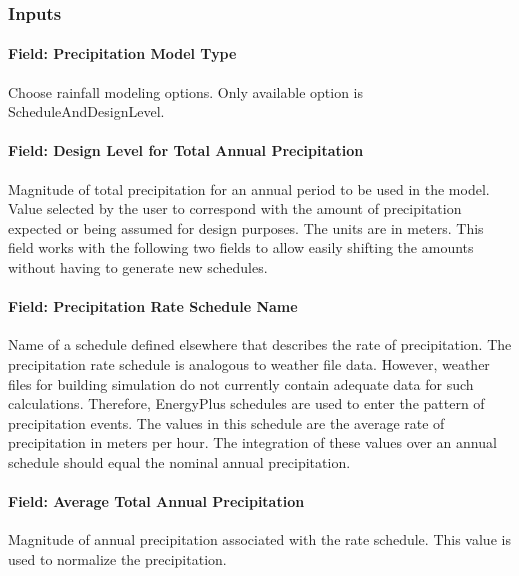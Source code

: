 \subsubsection{Inputs}\label{inputs-22-002}

\paragraph{Field: Precipitation Model Type}\label{field-precipitation-model-type}

Choose rainfall modeling options. Only available option is ScheduleAndDesignLevel.

\paragraph{Field: Design Level for Total Annual Precipitation}\label{field-design-level-for-total-annual-precipitation}

Magnitude of total precipitation for an annual period to be used in the model. Value selected by the user to correspond with the amount of precipitation expected or being assumed for design purposes. The units are in meters. This field works with the following two fields to allow easily shifting the amounts without having to generate new schedules.

\paragraph{Field: Precipitation Rate Schedule Name}\label{field-precipitation-rate-schedule-name}

Name of a schedule defined elsewhere that describes the rate of precipitation. The precipitation rate schedule is analogous to weather file data. However, weather files for building simulation do not currently contain adequate data for such calculations. Therefore, EnergyPlus schedules are used to enter the pattern of precipitation events. The values in this schedule are the average rate of precipitation in meters per hour. The integration of these values over an annual schedule should equal the nominal annual precipitation.

\paragraph{Field: Average Total Annual Precipitation}\label{field-average-total-annual-precipitation}

Magnitude of annual precipitation associated with the rate schedule. This value is used to normalize the precipitation.

